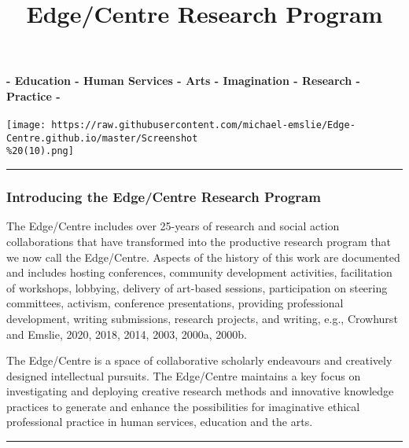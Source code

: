 \documentclass[
]{article}
\title{Edge/Centre Research Program}
\author{}
\date{\vspace{-2.5em}}
\begin{document}
\maketitle

\hypertarget{education---human-services---arts---imagination---research---practice--}{%
\paragraph{- Education - Human Services - Arts - Imagination - Research
- Practice
-}\label{education---human-services---arts---imagination---research---practice--}}

\texttt{[image: https://raw.githubusercontent.com/michael-emslie/Edge-Centre.github.io/master/Screenshot\\\%20(10).png]}

\begin{center}\rule{0.5\linewidth}{0.5pt}\end{center}

\hypertarget{introducing-the-edgecentre-research-program}{%
\subsubsection{Introducing the Edge/Centre Research
Program}\label{introducing-the-edgecentre-research-program}}

The Edge/Centre includes over 25-years of research and social action
collaborations that have transformed into the productive research
program that we now call the Edge/Centre. Aspects of the history of this
work are documented and includes hosting conferences, community
development activities, facilitation of workshops, lobbying, delivery of
art-based sessions, participation on steering committees, activism,
conference presentations, providing professional development, writing
submissions, research projects, and writing, e.g., Crowhurst and Emslie,
2020, 2018, 2014, 2003, 2000a, 2000b.

The Edge/Centre is a space of collaborative scholarly endeavours and
creatively designed intellectual pursuits. The Edge/Centre maintains a
key focus on investigating and deploying creative research methods and
innovative knowledge practices to generate and enhance the possibilities
for imaginative ethical professional practice in human services,
education and the arts.

\begin{center}\rule{0.5\linewidth}{0.5pt}\end{center}
\end{document}
